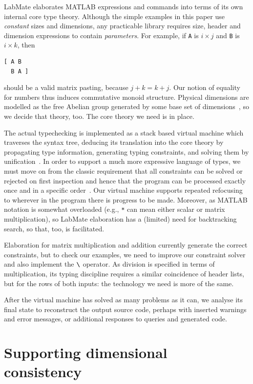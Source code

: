 \documentclass{IMEKO2024}
\newcommand{\bsl}{\texttt{\symbol{92}}}
\begin{document}
LabMate elaborates MATLAB expressions and commands into terms of its own internal core type theory.
%
Although the simple examples in this paper use \emph{constant} sizes and dimensions, any practicable library requires size, header and dimension expressions to contain \emph{parameters}.
%
For example, if \texttt{A} is $i\times j$ and \texttt{B} is $i\times k$, then
\begin{verbatim}
[ A B
  B A ]
\end{verbatim}
should be a valid matrix pasting, because $j+k = k+j$. Our notion of equality for numbers thus induces commutative monoid structure.
%
Physical dimensions are modelled as the free Abelian group generated by some base set of dimensions~\cite{dim.group}, so we decide that theory, too.
%
The core theory we need is in place.

The actual typechecking is implemented as a stack based virtual machine which traverses the syntax tree, deducing its translation into the core theory by propagating type information, generating typing constraints, and solving them by unification~\cite{robinson65}.
%
In order to support a much more expressive language of types, we must move on from the classic requirement that all constraints can be solved or rejected on first inspection and hence that the program can be processed exactly once and in a specific order~\cite{damas.milner}.
%
Our virtual machine supports repeated refocusing to wherever in the program there is progress to be made.
%
Moreover, as MATLAB notation is somewhat overloaded (e.g., \texttt{*} can mean either scalar or matrix multiplication), so LabMate elaboration has a (limited) need for backtracking search, so that, too, is facilitated.

Elaboration for matrix multiplication and addition currently generate the correct constraints, but to check our examples, we need to improve our constraint solver and also implement the $\bsl$ operator.
%
As division is specified in terms of multiplication, its typing discipline requires a similar coincidence of header lists, but for the rows of both inputs: the technology we need is more of the same.

After the virtual machine has solved as many problems as it can, we analyse its final state to reconstruct the output source code, perhaps with inserted warnings and error messages, or additional responses to queries and generated code.

\section{Supporting dimensional consistency}
\label{sec:example-revisited}
\end{document}
